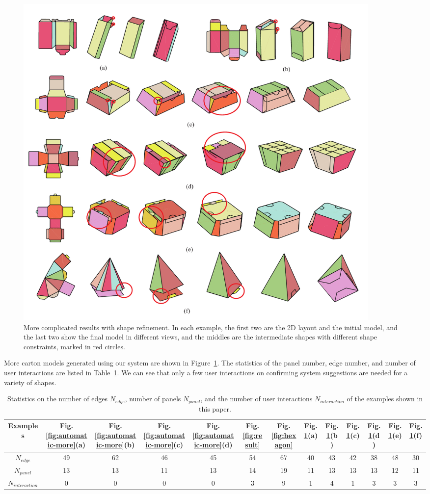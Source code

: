 \begin{figure}[h]
	\centering
	\includegraphics[width=0.9\textwidth]{images/newMore}
	\caption{More complicated results with shape refinement. In each example, the first two are the 2D layout and the initial model, and the last two show the final model in different views, and the middles are the intermediate shapes with different shape constraints, marked in red circles.}
	\label{fig:result-more}
\end{figure}



More carton models generated using our system  are shown in Figure~\ref{fig:result-more}.
The statistics of the panel number, edge number, and number of user interactions are listed in Table~\ref{table:statistics}. 
We can see that only a few user interactions on confirming system suggestions are needed for a variety of shapes.


\begin{table}
	\centering
	\caption{Statistics on the number of edges $N_{edge}$, number of panels $N_{panel}$, and the number of user interactions $N_{interaction}$ of the examples shown in this paper.}
	\setlength{\tabcolsep}{1pt}
	\begin{tabular}{c|c|c|c|c|c|c|c|c|c|c|c|c}
		\hline
		Examples & Fig.\ref{fig:automatic-more}(a) & Fig.\ref{fig:automatic-more}(b) &  Fig.\ref{fig:automatic-more}(c) & Fig.\ref{fig:automatic-more}(d) & Fig.\ref{fig:result} & Fig.\ref{fig:hexagon} & Fig.\ref{fig:result-more}(a) & Fig.\ref{fig:result-more}(b)& Fig.\ref{fig:result-more}(c) &  Fig.\ref{fig:result-more}(d) & Fig.\ref{fig:result-more}(e)& Fig.\ref{fig:result-more}(f)\\
		\hline
		$N_{edge}$ & 49 & 62 & 46 & 45 & 54 & 67 & 40 & 43 & 42 & 38 & 48 & 30\\
		$N_{panel}$  & 13 & 13 & 11 & 13 & 14 & 19 & 11 & 13 & 13 & 13 & 12 & 11\\
		$N_{interaction}$  & 0 & 0 & 0 & 0 & 3 & 9 & 1 & 4 & 1 & 3 & 3 & 3\\ 
		\hline
		\end{tabular}
		\label{table:statistics}
\end{table}


